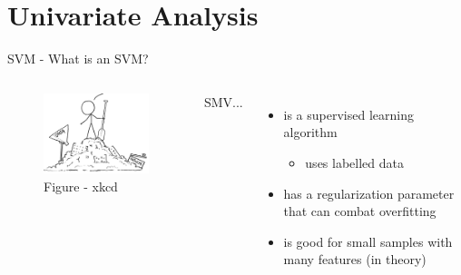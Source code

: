 \documentclass[10pt]{beamer}
\begin{document}
\section{Univariate Analysis}
\begin{frame}[fragile]{SVM - What is an SVM?}
\begin{columns}[T,onlytextwidth]
\begin{center}
\begin{figure}
      \includegraphics[height=0.6\textwidth]{machine_learning.png}
      \caption*{Figure - xkcd}
	\end{figure}
	\end{center}
SMV...
\begin{itemize}
\item is a supervised learning algorithm
\begin{itemize}
\item uses labelled data
\end{itemize}
\item has a regularization parameter that can combat overfitting
\item is good for small samples with many features (in theory)
\end{itemize}
\end{columns}
\end{frame}
\end{document}
